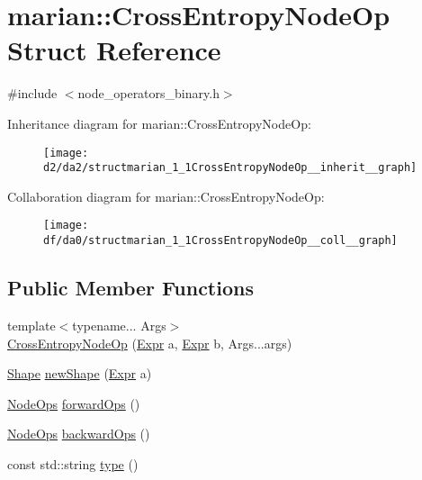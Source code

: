 \hypertarget{structmarian_1_1CrossEntropyNodeOp}{}\section{marian\+:\+:Cross\+Entropy\+Node\+Op Struct Reference}
\label{structmarian_1_1CrossEntropyNodeOp}


{\ttfamily \#include $<$node\+\_\+operators\+\_\+binary.\+h$>$}



Inheritance diagram for marian\+:\+:Cross\+Entropy\+Node\+Op\+:
\nopagebreak
\begin{figure}[H]
\begin{center}
\leavevmode
\texttt{[image: d2/da2/structmarian\_1\_1CrossEntropyNodeOp\_\_inherit\_\_graph]}
\end{center}
\end{figure}


Collaboration diagram for marian\+:\+:Cross\+Entropy\+Node\+Op\+:
\nopagebreak
\begin{figure}[H]
\begin{center}
\leavevmode
\texttt{[image: df/da0/structmarian\_1\_1CrossEntropyNodeOp\_\_coll\_\_graph]}
\end{center}
\end{figure}
\subsection*{Public Member Functions}
\begin{DoxyCompactItemize}
\item 
{\footnotesize template$<$typename... Args$>$ }\\\hyperlink{structmarian_1_1CrossEntropyNodeOp_ac48a140d97cbf643601b2d16cdc674e0}{Cross\+Entropy\+Node\+Op} (\hyperlink{namespacemarian_a498d8baf75b754011078b890b39c8e12}{Expr} a, \hyperlink{namespacemarian_a498d8baf75b754011078b890b39c8e12}{Expr} b, Args...\+args)
\item 
\hyperlink{structmarian_1_1Shape}{Shape} \hyperlink{structmarian_1_1CrossEntropyNodeOp_a1e72292a14569fda92abc806dbc79acb}{new\+Shape} (\hyperlink{namespacemarian_a498d8baf75b754011078b890b39c8e12}{Expr} a)
\item 
\hyperlink{namespacemarian_a4956376218cc236016c20bc4071470da}{Node\+Ops} \hyperlink{structmarian_1_1CrossEntropyNodeOp_a97a41f78385e61ab9b5228e6a8429e81}{forward\+Ops} ()
\item 
\hyperlink{namespacemarian_a4956376218cc236016c20bc4071470da}{Node\+Ops} \hyperlink{structmarian_1_1CrossEntropyNodeOp_ac500562de661363f71a0f16331dd60e7}{backward\+Ops} ()
\item 
const std\+::string \hyperlink{structmarian_1_1CrossEntropyNodeOp_abce29fdc82fc339597d2e2f06a585e4d}{type} ()
\end{DoxyCompactItemize}
